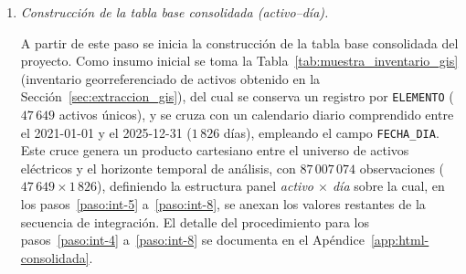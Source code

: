 {\begin{enumerate}
\begin{itemize}
            \item \textit{Actual (Sección~\ref{sec:extraccion_oms_actual} -- OMS SP7):} cruce por \texttt{MANIOBRA\_APERTURA} $\leftrightarrow$ \texttt{ID\_EVENTO} para completar \texttt{ELEMENTO\_FALLADO} con el valor de \texttt{ELEMENTO\_FALLA}, junto con \texttt{TIPO\_ELEMENTO}, en eventos del periodo post-migración.
        \end{itemize}
    
        \item\label{paso:int-4} \textit{Construcción de la tabla base consolidada (activo--día).}\mbox{}\par\vspace{0.2em}\noindent
        A partir de este paso se inicia la construcción de la tabla base consolidada del proyecto. Como insumo inicial se toma la Tabla~\ref{tab:muestra_inventario_gis} (inventario georreferenciado de activos obtenido en la Sección~\ref{sec:extraccion_gis}), del cual se conserva un registro por \texttt{ELEMENTO} ($47\,649$ activos únicos), y se cruza con un calendario diario comprendido entre el 2021-01-01 y el 2025-12-31 ($1\,826$ días), empleando el campo \texttt{FECHA\_DIA}. Este cruce genera un producto cartesiano entre el universo de activos eléctricos y el horizonte temporal de análisis, con $87\,007\,074$ observaciones ($47\,649 \times 1\,826$), definiendo la estructura panel \textit{activo $\times$ día} sobre la cual, en los pasos~\ref{paso:int-5} a~\ref{paso:int-8}, se anexan los valores restantes de la secuencia de integración. El detalle del procedimiento para los pasos~\ref{paso:int-4} a~\ref{paso:int-8} se documenta en el Apéndice~\ref{app:html-consolidada}.
    

\end{enumerate}}
